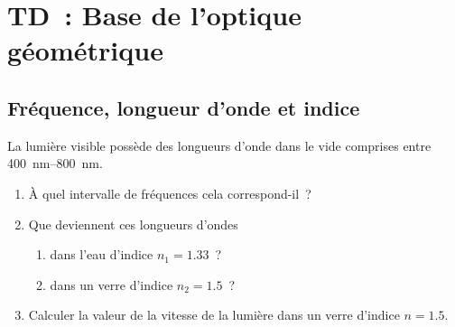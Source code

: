 \documentclass[../../main/main.tex]{subfiles}
\begin{document}
\setcounter{chapter}{1}

\chapter{TD~: Base de l'optique g\'eom\'etrique}

\section{Fréquence, longueur d'onde et indice}
La lumière visible possède des longueurs d'onde dans le vide comprises entre
\SIrange{400}{800}{nm}.
\begin{enumerate}
	\item À quel intervalle de fréquences cela correspond-il~?
	\item Que deviennent ces longueurs d'ondes
	      \begin{enumerate}
		      \item dans l'eau d'indice $n_1 = \num{1.33}$~?
		      \item dans un verre d'indice $n_2 = \num{1.5}$~?
	      \end{enumerate}
	\item Calculer la valeur de la vitesse de la lumière dans un verre d'indice
	      $n = \num{1.5}$.
\end{enumerate}
\end{document}

